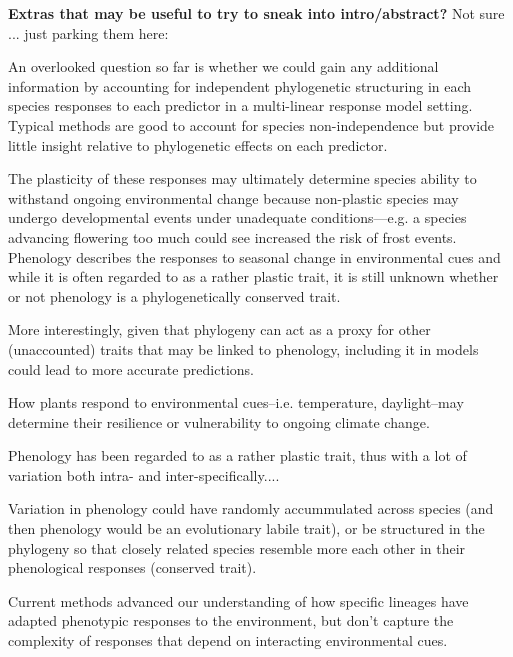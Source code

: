 \documentclass{article}\usepackage[]{graphicx}\usepackage[]{color}
\begin{document}
{\bf Extras that may be useful to try to sneak into intro/abstract?} Not sure ... just parking them here:

An overlooked question so far is whether we could gain any additional information by accounting for independent phylogenetic structuring in each species responses to each predictor in a multi-linear response model setting. Typical methods are good to account for species non-independence but provide little insight relative to phylogenetic effects on each predictor.

The plasticity of these responses may ultimately determine species ability to withstand ongoing environmental change because non-plastic species may undergo developmental events under unadequate conditions---e.g. a species advancing flowering too much could see increased the risk of frost events. Phenology describes the responses to seasonal change in environmental cues and while it is often regarded to as a rather plastic trait, it is still unknown whether or not phenology is a phylogenetically conserved trait. 

More interestingly, given that phylogeny can act as a proxy for other (unaccounted) traits that may be linked to phenology, including it in models could lead to more accurate predictions.

How plants respond to environmental cues--i.e. temperature, daylight--may determine their resilience or vulnerability to ongoing climate change.

Phenology has been regarded to as a rather plastic trait, thus with a lot of variation both intra- and inter-specifically....

Variation in phenology could have randomly accummulated across species (and then phenology would be an evolutionary labile trait), or be structured in the phylogeny so that closely related species resemble more each other in their phenological responses (conserved trait).

Current methods advanced our understanding of how specific lineages have adapted phenotypic responses to the environment, but don't capture the complexity of responses that depend on interacting environmental cues. 
\end{document}
